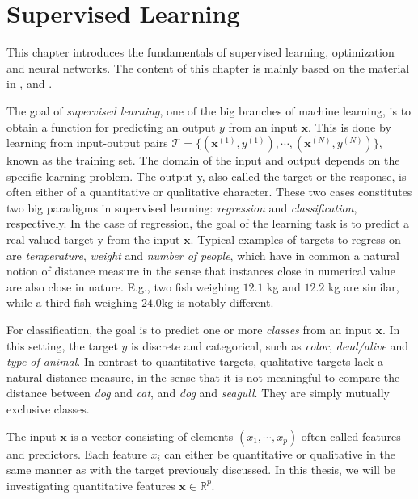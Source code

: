 \chapter{Supervised Learning}\label{chap:SupervisedLearning}

This chapter introduces the fundamentals of supervised learning, optimization and neural networks. The content of this chapter is mainly based on the material in \cite{SupervisedwquantumComputers}, \cite{hastie01statisticallearning} and \cite{nielsenneural}.

The goal of \emph{supervised learning}, one of the big branches of machine learning, is to obtain a function for predicting an output $y$ from an input $\boldsymbol{x}$. This is done by learning from input-output pairs $\mathcal{T} = \{(\boldsymbol{x}^{(1)}, y^{(1)}), \cdots, (\boldsymbol{x}^{(N)}, y^{(N)})\}$, known as the training set. The domain of the input and output depends on the specific learning problem. The output y, also called the target or the response, is often either of a quantitative or qualitative character. These two cases constitutes two big paradigms in supervised learning: \emph{regression} and \emph{classification}, respectively. In the case of regression, the goal of the learning task is to predict a real-valued target y from the input $\boldsymbol{x}$. Typical examples of targets to regress on are \emph{temperature}, \emph{weight} and \emph{number of people}, which have in common a natural notion of distance measure in the sense that instances close in numerical value are also close in nature. E.g., two fish weighing $12.1$ kg and $12.2$ kg are similar, while a third fish weighing $24.0$kg is notably different.

For classification, the goal is to predict one or more \emph{classes} from an input $\boldsymbol{x}$. In this setting, the target $y$ is discrete and categorical, such as \emph{color}, \emph{dead/alive} and \emph{type of animal}. In contrast to quantitative targets, qualitative targets lack a natural distance measure, in the sense that it is not meaningful to compare the distance between \emph{dog} and \emph{cat}, and \emph{dog} and \emph{seagull}. They are simply mutually exclusive classes.

The input $\boldsymbol{x}$ is a vector consisting of elements $(x_1, \cdots, x_p)$ often called features and predictors. Each feature $x_i$ can either be quantitative or qualitative in the same manner as with the target previously discussed. In this thesis, we will be investigating quantitative features $\boldsymbol{x} \in \mathbb{R}^{p}$.


